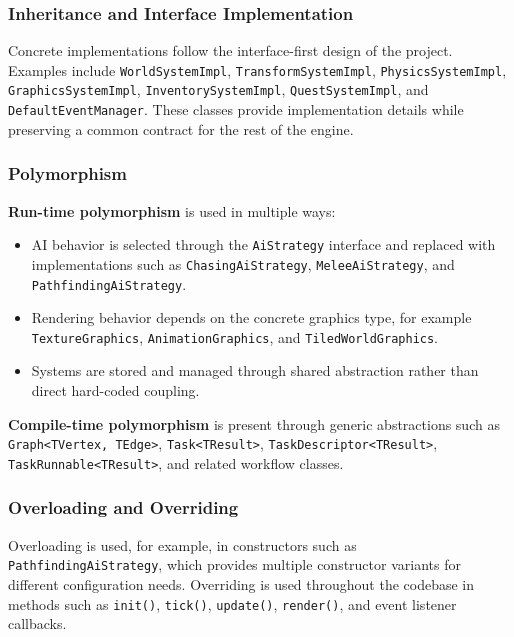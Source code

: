 \documentclass[12pt]{extarticle}
\begin{document}
\subsubsection{Inheritance and Interface Implementation}
Concrete implementations follow the interface-first design of the project. Examples include \texttt{WorldSystemImpl}, \texttt{TransformSystemImpl}, \texttt{PhysicsSystemImpl}, \texttt{GraphicsSystemImpl}, \texttt{InventorySystemImpl}, \texttt{QuestSystemImpl}, and \texttt{DefaultEventManager}. These classes provide implementation details while preserving a common contract for the rest of the engine.

\subsubsection{Polymorphism}
\textbf{Run-time polymorphism} is used in multiple ways:
\begin{itemize}[leftmargin=1.5em]
    \item AI behavior is selected through the \texttt{AiStrategy} interface and replaced with implementations such as \texttt{ChasingAiStrategy}, \texttt{MeleeAiStrategy}, and \texttt{PathfindingAiStrategy}.
    \item Rendering behavior depends on the concrete graphics type, for example \texttt{TextureGraphics}, \texttt{AnimationGraphics}, and \texttt{TiledWorldGraphics}.
    \item Systems are stored and managed through shared abstraction rather than direct hard-coded coupling.
\end{itemize}

\textbf{Compile-time polymorphism} is present through generic abstractions such as \texttt{Graph<TVertex, TEdge>}, \texttt{Task<TResult>}, \texttt{TaskDescriptor<TResult>}, \texttt{TaskRunnable<TResult>}, and related workflow classes.

\subsubsection{Overloading and Overriding}
Overloading is used, for example, in constructors such as \texttt{PathfindingAiStrategy}, which provides multiple constructor variants for different configuration needs. Overriding is used throughout the codebase in methods such as \texttt{init()}, \texttt{tick()}, \texttt{update()}, \texttt{render()}, and event listener callbacks.
\end{document}
